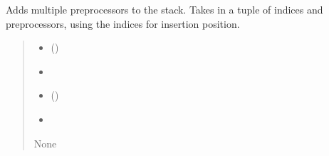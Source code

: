 \documentclass[letterpaper,10pt,english]{sphinxmanual}
\begin{document}
\begin{fulllineitems}
\begin{fulllineitems}
\label{\detokenize{preprocessor_stack:at_nlp.filters.preprocessor_stack.PreprocessorStack.add_multiple}}
\pysigstartsignatures
{}
\pysigstopsignatures
\sphinxAtStartPar
Adds multiple preprocessors to the stack. Takes in a tuple of indices and preprocessors, using the indices
for insertion position.
\begin{quote}\begin{description}
\begin{itemize}
\item {} 
\sphinxAtStartPar
\sphinxstyleliteralstrong{\sphinxupquote{(}}\sphinxstyleliteralstrong{\sphinxupquote{{[}}}\sphinxstyleliteralstrong{\sphinxupquote{{[}}} () \textendash{} 

\item {} 
\sphinxAtStartPar
{}\sphinxstyleliteralstrong{\sphinxupquote{{[}}}\sphinxstyleliteralstrong{\sphinxupquote{{[}}} \textendash{} 

\item {} 
\sphinxAtStartPar
{}\sphinxstyleliteralstrong{\sphinxupquote{{]}}} (\sphinxstyleliteralemphasis{\sphinxupquote{ |}}) \textendash{} 

\item {} 
\sphinxAtStartPar
{}\sphinxstyleliteralstrong{\sphinxupquote{{]}}}\sphinxstyleliteralstrong{\sphinxupquote{{]}}}\sphinxstyleliteralstrong{\sphinxupquote{{]}}} \textendash{} 

\end{itemize}

\sphinxAtStartPar
None

\end{description}\end{quote}

\end{fulllineitems}
\end{fulllineitems}
\end{document}
